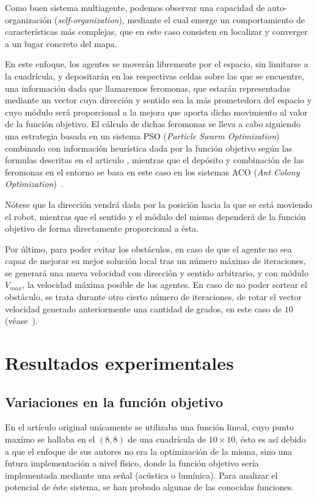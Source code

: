 \documentclass[runningheads]{llncs}
\begin{document}
    Como buen sistema multiagente, podemos observar una capacidad de auto-organización (\textit{self-organization}), mediante el cual emerge un comportamiento de características más complejas, que en este caso consisten en localizar y converger a un lugar concreto del mapa.

    En este enfoque, los agentes se moverán libremente por el espacio, sin limitarse a la cuadrícula, y depositarán en las respectivas celdas sobre las que se encuentre, una información dada que llamaremos feromonas, que estarán representadas mediante un vector cuya dirección y sentido sea la más prometedora del espacio y cuyo módulo será proporcional a la mejora que aporta dicho movimiento al valor de la función objetivo. El cálculo de dichas feromonas se lleva a cabo siguiendo una estrategia basada en un sistema PSO (\textit{Particle Swarm Optimization})~\cite{PSO} combinado con información heurística dada por la función objetivo según las formulas descritas en el articulo \cite{initialPaper}, mientras que el depósito y combinación de las feromonas en el entorno se basa en este caso en los sistemas ACO (\textit{Ant Colony Optimization})~\cite{ACO}.
    
    Nótese que la dirección vendrá dada por la posición hacia la que se está moviendo el robot, mientras que el sentido y el módulo del mismo dependerá de la función objetivo de forma directamente proporcional a ésta.

    Por último, para poder evitar los obstáculos, en caso de que el agente no sea capaz de mejorar su mejor solución local tras un número máximo de iteraciones, se generará una nueva velocidad con dirección y sentido arbitrario, y con módulo $V_{max}$, la velocidad máxima posible de los agentes. En caso de no poder sortear el obstáculo, se trata durante otro cierto número de iteraciones, de rotar el vector velocidad generado anteriormente una cantidad de grados, en este caso de $10$ (véase~\cite{referencedPaper}).


    \section{Resultados experimentales}



    \subsection{Variaciones en la función objetivo}
    En el artículo original \cite{initialPaper} unícamente se utilizaba una función lineal, cuyo punto maxímo se hallaba en el $(8,8)$ de una cuadrícula de $10\times10$, ésto es así debido a que el enfoque de sus autores no era la optimización de la misma, sino una futura implementación a nivel físico, donde la función objetivo sería implementada mediante una señal (acústica o lumínica). Para analizar el potencial de éste sistema, se han probado algunas de las conocidas funciones.
\end{document}
